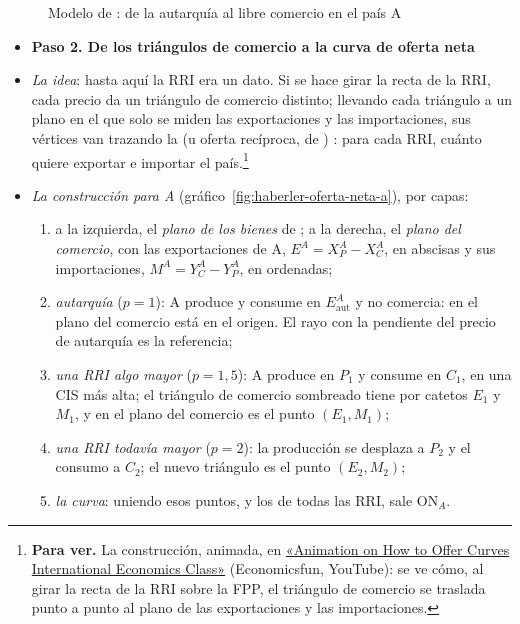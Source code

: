 \documentclass[11pt]{article}
\begin{document}
\begin{figure}[H]
\centering
\caption{Modelo de : de la autarquía al libre comercio en el país A}\label{fig:haberler-comercio}
\end{figure}

\begin{itemize}
\item[] \textbf{Paso 2. De los triángulos de comercio a la curva de oferta neta}
\item \emph{La idea}: hasta aquí la RRI era un dato. Si se hace girar la recta de la RRI, cada precio da un triángulo de comercio distinto; llevando cada triángulo a un plano en el que solo se miden las exportaciones y las importaciones, sus vértices van trazando la  (u oferta recíproca, de \textcite{Marshall1879Pure}) : para cada RRI, cuánto quiere exportar e importar el país.\footnote{\textbf{Para ver.} La construcción, animada, en \href{https://www.youtube.com/watch?v=avf0o-PzQEA}{«Animation on How to Offer Curves International Economics Class»} (Economicsfun, YouTube): se ve cómo, al girar la recta de la RRI sobre la FPP, el triángulo de comercio se traslada punto a punto al plano de las exportaciones y las importaciones.}
\item \emph{La construcción para A} (gráfico~\ref{fig:haberler-oferta-neta-a}), por capas:
  \begin{enumerate}
  \item a la izquierda, el \emph{plano de los bienes} de ; a la derecha, el \emph{plano del comercio}, con las exportaciones de A, $E^A=X^A_P-X^A_C$, en abscisas y sus importaciones, $M^A=Y^A_C-Y^A_P$, en ordenadas;
  \item \emph{autarquía} ($p=1$): A produce y consume en $E^A_{\mathrm{aut}}$ y no comercia: en el plano del comercio está en el origen. El rayo con la pendiente del precio de autarquía es la referencia;
  \item \emph{una RRI algo mayor} ($p=1{,}5$): A produce en $P_1$ y consume en $C_1$, en una CIS más alta; el triángulo de comercio sombreado tiene por catetos $E_1$ y $M_1$, y en el plano del comercio es el punto $(E_1,M_1)$;
  \item \emph{una RRI todavía mayor} ($p=2$): la producción se desplaza a $P_2$ y el consumo a $C_2$; el nuevo triángulo es el punto $(E_2,M_2)$;
  \item \emph{la curva}: uniendo esos puntos, y los de todas las RRI, sale ON$_A$.
  \end{enumerate}
\end{itemize}
\end{document}
